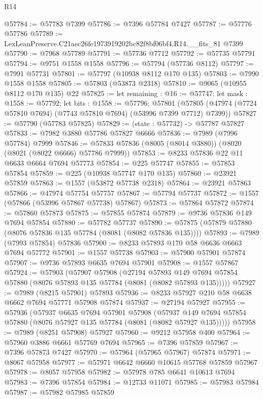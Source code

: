 \begin{lexlean}{R14}
\begin{coremodule}
@57784 := @57783 @7399
@57786 := @7396 @57784 @7427
@57787 := @57776 @57786
@57789 := LexLeanPreserve.C21aec26fe1973919202bc82f8bf06bf4.R14.__fits_81 @7399
@57790 := @7968 @57789
@57791 := @57736 @7712
@57792 := @57735 @57791
@57794 := @9751 @1558 @1558
@57796 := @57794 (@57736 @8112)
@57797 := @7991 @57731
@57801 := @57797 (@10938 @8112 @170 @135)
@57803 := @7990 @1558 @1558
@57805 := @57803 (@53873 @2318)
@57810 := @9065 (@10955 @8112 @170 @135) @22
@57825 := let remaining : @16 := @57747;
  let mask : @1558 := @57792;
  let bits : @1558 := @57796;
  @57801 (@57805 (@47974 (@7724 @57810 @7694) (@7743 @57810 @7694) (@53996 @7399 @7712) @7399))
@57827 := @57790 (@57783 @57825)
@57829 := (state : @57732) -> @57787 @57827
@57833 := @7982 @3880 @57786 @57827 @6666
@57836 := @7989 (@7996 @57784) @7999
@57846 := @57833 @57836 (@8005 (@8014 @3880)) (@8020 (@8021 (@8022 @6666) @57786 @7999))
@57853 := @8233 @57836 @22 @11 @6633 @6664 @7694 @57773
@57854 := @225 @57747
@57855 := @57853 @57854
@57859 := @225 (@10938 @57747 @170 @135)
@57860 := @23921 @57859
@57863 := @1557 (@53872 @57738 @2318)
@57864 := @23921 @57863
@57866 := @47974 @57754 @57757
@57867 := @57794 @57737
@57872 := @1557 (@57866 (@53996 @57867 @57738) @57867)
@57873 := @57864 @57872
@57874 := @57860 @57873
@57875 := @57855 @57874
@57879 := @9736 @57836 @149 @7694 @57854
@57880 := @57782 @57737
@57890 := @57875 (@57879 @57880 (@8076 @57836 @135 @57784 (@8081 (@8082 @57836 @135))))
@57893 := @7989 (@7993 @57854) @57836
@57900 := @8233 @57893 @170 @58 @6636 @6663 @7694 @57772
@57901 := @1557 @57738
@57903 := @57900 @57901 @57874
@57907 := @9736 @57893 @6635 @7694 @57901
@57908 := @1557 @57867
@57924 := @57903
    (@57907
      @57908
      (@27194
        @57893
        @149
        @7694
        @57854
        @57880
        (@8076 @57893 @135 @57784 (@8081 (@8082 @57893 @135)))))
@57927 := @7989 (@8215 @57901) @57893
@57936 := @8233 @57927 @210 @58 @6638 @6662 @7694 @57771 @57908 @57874
@57937 := @27194 @57927
@57955 := @57936
    (@57937
      @6635
      @7694
      @57901
      @57908
      (@57937 @149 @7694 @57854 @57880 (@8076 @57927 @135 @57784 (@8081 (@8082 @57927 @135)))))
@57958 := @7989 (@8251 @57908) @57927
@57960 := @9212 @57958 @400
@57964 := @57960 @3886 @6661 @57769 @7694
@57965 := @7396 @57859
@57967 := @7396 @57873 @7427
@57970 := @57964 (@57965 @57967) @57874
@57971 := @8067 @57958
@57977 := @57971 @6642 @6660 @10615 @57768 @57859 @57967
@57978 := @8057 @57958
@57982 := @57978 @785 @6641 @10613 @7694
@57983 := @7396 @57854
@57984 := @12733 @11071
@57985 := @57983 @57984
@57987 := @57982 @57985 @57859

\end{coremodule}
\end{lexlean}
